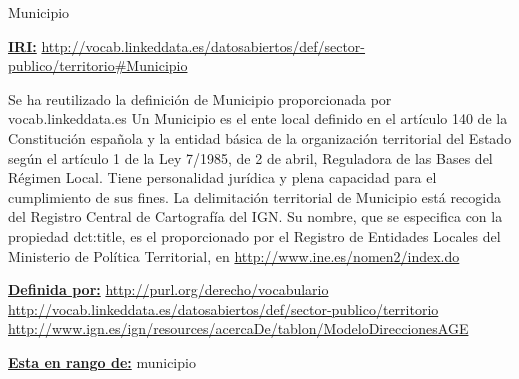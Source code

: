 \begin{mybox}{Municipio}
\begin{flushleft}
\underline{\textbf{IRI:}}
\url{http://vocab.linkeddata.es/datosabiertos/def/sector-publico/territorio#Municipio}
\newline

Se ha reutilizado la definición de Municipio proporcionada por vocab.linkeddata.es \cite{datoabiertos_municipio}
Un Municipio es el ente local definido en el artículo 140 de la Constitución española y la entidad básica de la organización territorial del Estado según el artículo 1 de la Ley 7/1985, de 2 de abril, Reguladora de las Bases del Régimen Local. Tiene personalidad jurídica y plena capacidad para el cumplimiento de sus fines. La delimitación territorial de Municipio está recogida del Registro Central de Cartografía del IGN. Su nombre, que se especifica con la propiedad dct:title, es el proporcionado por el Registro de Entidades Locales del Ministerio de Política Territorial, en \url{http://www.ine.es/nomen2/index.do}
\newline


\underline{\textbf{Definida por:}}
\newline \url{http://purl.org/derecho/vocabulario}
\newline \url{http://vocab.linkeddata.es/datosabiertos/def/sector-publico/territorio}
\newline \url{http://www.ign.es/ign/resources/acercaDe/tablon/ModeloDireccionesAGE}
\newline

\underline{\textbf{Esta en rango de:}} municipio



\end{flushleft}
\end{mybox}





